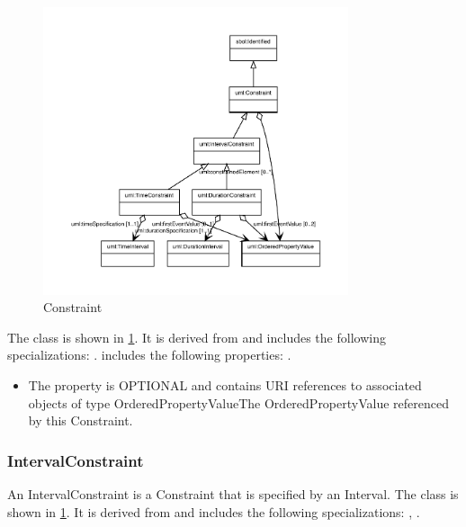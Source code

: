 \begin{figure}[h!]%
\centering%
\includegraphics[width=0.8\textwidth]{uml_classes/Constraint_abstraction_hierarchy.pdf}%
\caption{Constraint}%
\label{fig:Constraint}%
\end{figure}

%
The  class is shown in \ref{fig:Constraint}. It is derived from  and includes the following specializations: . %
 includes the following properties: . %
\begin{itemize}%
\item%
The  property is OPTIONAL and contains URI references to associated objects of type OrderedPropertyValueThe OrderedPropertyValue referenced by this Constraint.%
\end{itemize}%
\subsubsection{IntervalConstraint}%
\label{sec:uml:IntervalConstraint}%
An IntervalConstraint is a Constraint that is specified by an Interval.%
\linebreak%
\linebreak%
The  class is shown in \ref{fig:Constraint}. It is derived from  and includes the following specializations: , . %
%

